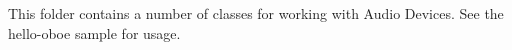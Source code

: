 This folder contains a number of classes for working with Audio Devices. See the hello-\/oboe sample for usage. 